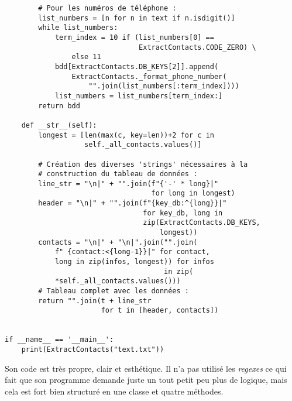 \begin{lstlisting}
        # Pour les numéros de téléphone :
        list_numbers = [n for n in text if n.isdigit()]
        while list_numbers:
            term_index = 10 if (list_numbers[0] ==
                                ExtractContacts.CODE_ZERO) \
                else 11
            bdd[ExtractContacts.DB_KEYS[2]].append(
                ExtractContacts._format_phone_number(
                    "".join(list_numbers[:term_index])))
            list_numbers = list_numbers[term_index:]
        return bdd

    def __str__(self):
        longest = [len(max(c, key=len))+2 for c in
                   self._all_contacts.values()]

        # Création des diverses 'strings' nécessaires à la
        # construction du tableau de données :
        line_str = "\n|" + "".join(f"{'-' * long}|"
                                   for long in longest)
        header = "\n|" + "".join(f"{key_db:^{long}}|"
                                 for key_db, long in
                                 zip(ExtractContacts.DB_KEYS,
                                     longest))
        contacts = "\n|" + "\n|".join("".join(
            f" {contact:<{long-1}}|" for contact,
            long in zip(infos, longest)) for infos
                                      in zip(
            *self._all_contacts.values()))
        # Tableau complet avec les données :
        return "".join(t + line_str 
                       for t in [header, contacts])


if __name__ == '__main__':
    print(ExtractContacts("text.txt"))
\end{lstlisting}
\medskip

Son code est très propre, clair et esthétique. Il n'a pas utilisé les \textit{regexes} ce qui fait que son programme demande juste un tout petit peu plus de logique, mais cela est fort bien structuré en une classe et quatre méthodes.
\medskip

